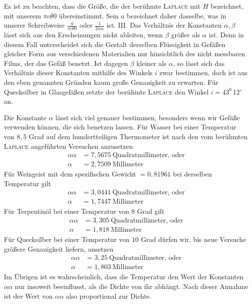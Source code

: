 \expandafter\def\csname HistoricalNoteText7\endcsname{Es ist zu beachten, dass die Größe, die der berühmte \textsc{Laplace} mit $H$ bezeichnet, mit unserem $\pi c\theta0$ übereinstimmt. Sein $a$ bezeichnet daher dasselbe, was in unserer Schreibweise $\frac{g}{\pi c\theta0}$ oder $\frac1{2\alpha\alpha}$ ist.}%
III. Das Verhältnis der Konstanten $\alpha,\beta$ lässt sich aus den Erscheinungen nicht ableiten, wenn $\beta$ größer als $\alpha$ ist. Denn in diesem Fall unterscheidet sich die Gestalt derselben Flüssigkeit in Gefäßen gleicher Form aus verschiedenen Materialien nur hinsichtlich des nicht messbaren Films, der das Gefäß benetzt. Ist dagegen $\beta$ kleiner als $\alpha$, so lässt sich das Verhältnis dieser Konstanten mithilfe des Winkels $i$ zwar bestimmen, doch ist aus den eben genannten Gründen kaum große Genauigkeit zu erwarten. Für Quecksilber in Glasgefäßen setzte der berühmte \textsc{Laplace} den Winkel $i=43^0\,12'$ an.

Die Konstante $\alpha$ lässt sich viel genauer bestimmen, besonders wenn wir Gefäße verwenden können, die sich benetzen lassen. Für Wasser bei einer Temperatur von $8{,}5$ Grad auf dem hundertteiligen Thermometer ist nach den vom berühmten \textsc{Laplace} angeführten Versuchen anzusetzen
\[
\begin{aligned}
\alpha\alpha&=7{,}5675\ \text{Quadratmillimeter, oder}\\
\alpha&=2{,}7509\ \text{Millimeter}
\end{aligned}
\]
Für Weingeist mit dem spezifischen Gewicht $=0{,}81961$ bei derselben Temperatur gilt
\[
\begin{aligned}
\alpha\alpha&=3{,}0441\ \text{Quadratmillimeter, oder}\\
\alpha&=1{,}7447\ \text{Millimeter}
\end{aligned}
\]
Für Terpentinöl bei einer Temperatur von $8$ Grad gilt
\[
\begin{aligned}
\alpha\alpha&=3{,}305\ \text{Quadratmillimeter, oder}\\
\alpha&=1{,}818\ \text{Millimeter}
\end{aligned}
\]
Für Quecksilber bei einer Temperatur von $10$ Grad dürfen wir, bis neue Versuche größere Genauigkeit liefern, ansetzen
\[
\begin{aligned}
\alpha\alpha&=3{,}25\ \text{Quadratmillimeter, oder}\\
\alpha&=1{,}803\ \text{Millimeter}
\end{aligned}
\]
Im Übrigen ist es wahrscheinlich, dass die Temperatur den Wert der Konstanten $\alpha\alpha$ nur insoweit beeinflusst, als die Dichte von ihr abhängt. Nach dieser Annahme ist der Wert von $\alpha\alpha$ also proportional zur Dichte.

